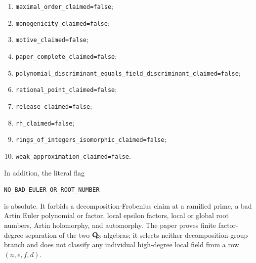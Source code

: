\begin{enumerate}[label=\texttt{F\arabic*.},leftmargin=3.5em]
\item \texttt{maximal\_order\_claimed=false};
\item \texttt{monogenicity\_claimed=false};
\item \texttt{motive\_claimed=false};
\item \texttt{paper\_complete\_claimed=false};
\item \texttt{polynomial\_discriminant\_equals\_field\_discriminant\_claimed=false};
\item \texttt{rational\_point\_claimed=false};
\item \texttt{release\_claimed=false};
\item \texttt{rh\_claimed=false};
\item \texttt{rings\_of\_integers\_isomorphic\_claimed=false};
\item \texttt{weak\_approximation\_claimed=false}.
\end{enumerate}

In addition, the literal flag
\begin{center}
\texttt{NO\_BAD\_EULER\_OR\_ROOT\_NUMBER}
\end{center}
is absolute.  It forbids a decomposition-Frobenius claim at a ramified prime,
a bad Artin Euler polynomial or factor, local epsilon factors, local or
global root numbers, Artin holomorphy, and automorphy.  The paper proves
finite factor-degree separation of the two $\mathbf{Q}_3$-algebras; it selects
neither decomposition-group branch and does not classify any individual
high-degree local field from a row $(n,e,f,d)$.
